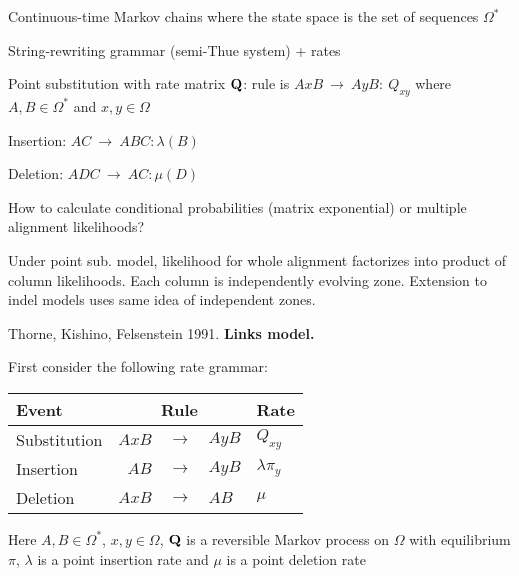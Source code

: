 \documentclass{beamer}
\begin{document}
\begin{frame}{}

\itemb
\item Continuous-time Markov chains where the state space is the set of sequences $\Omega^\ast$
\item String-rewriting grammar (semi-Thue system) + rates
 \itemb
 \item Point substitution with rate matrix ${\bf Q}$: rule is $AxB\ \to\ AyB:\ Q_{xy}$ where $A,B \in \Omega^\ast$ and $x,y \in \Omega$
 \item Insertion: $AC\ \to\ ABC:\lambda(B)$
 \item Deletion: $ADC\ \to\ AC:\mu(D)$
 \iteme
\item How to calculate conditional probabilities (matrix exponential) or multiple alignment likelihoods?
\item Under point sub. model, likelihood for whole alignment factorizes into product of column likelihoods.
Each column is independently evolving zone. Extension to indel models uses same idea of independent zones.
\iteme
\end{frame}

\begin{frame}{}
\itemb
\item Thorne, Kishino, Felsenstein 1991. {\bf Links model.}
 \itemb
 \item First consider the following rate grammar: \\
\begin{tabular}{l|rll|l}
Event & \multicolumn{3}{c|}{Rule} & Rate \\
\hline
Substitution & $AxB$ & $\to$ & $AyB$ & $Q_{xy}$ \\
Insertion & $AB$ & $\to$ & $AyB$ & $\lambda \pi_y$ \\
Deletion & $AxB$ & $\to$ & $AB$ & $\mu$
\end{tabular}
 \item Here $A,B \in \Omega^\ast$, $x,y \in \Omega$, ${\bf Q}$ is a reversible Markov process on $\Omega$ with equilibrium $\pi$,
$\lambda$ is a point insertion rate and $\mu$ is a point deletion rate
 \iteme
\iteme
\end{frame}
\end{document}

